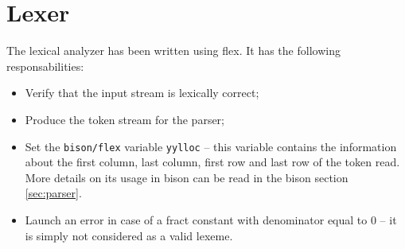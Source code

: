 \section{Lexer}
The lexical analyzer has been written using flex.
It has the following responsabilities:
\begin{itemize}
\item Verify that the input stream is lexically correct;
\item Produce the token stream for the parser;
\item Set the \verb|bison/flex| variable \verb|yylloc| -- this
variable contains the information about the first column, last column,
first row and last row of the token read. More details on its usage in
bison can be read in the bison section \ref{sec:parser}.
\item Launch an error in case of a fract constant with denominator equal
to $0$ -- it is simply not considered as a valid lexeme.
\end{itemize}

